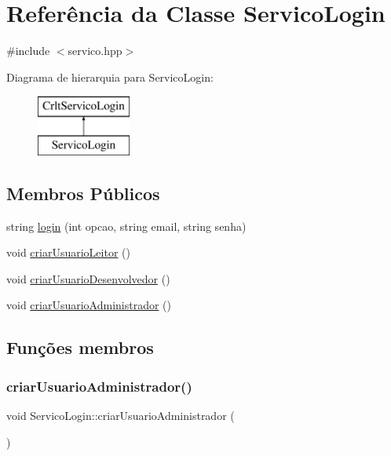 \hypertarget{class_servico_login}{}\section{Referência da Classe Servico\+Login}
\label{class_servico_login}


{\ttfamily \#include $<$servico.\+hpp$>$}

Diagrama de hierarquia para Servico\+Login\+:\begin{figure}[H]
\begin{center}
\leavevmode
\includegraphics[height=2.000000cm]{class_servico_login}
\end{center}
\end{figure}
\subsection*{Membros Públicos}
\begin{DoxyCompactItemize}
\item 
string \mbox{\hyperlink{class_servico_login_a0dd44bd72da82fa932e4929edbefb6ea}{login}} (int opcao, string email, string senha)
\item 
void \mbox{\hyperlink{class_servico_login_ae6786007e98ac8288dc53d025d5f5bcd}{criar\+Usuario\+Leitor}} ()
\item 
void \mbox{\hyperlink{class_servico_login_aff5fc69ce9c3fa82c6c575f025ac2a34}{criar\+Usuario\+Desenvolvedor}} ()
\item 
void \mbox{\hyperlink{class_servico_login_a2f7e5d945f4ce6b06c8ce093ed3755e7}{criar\+Usuario\+Administrador}} ()
\end{DoxyCompactItemize}


\subsection{Funções membros}
\mbox{\label{class_servico_login_a2f7e5d945f4ce6b06c8ce093ed3755e7}} 
\subsubsection{\texorpdfstring{criar\+Usuario\+Administrador()}{criarUsuarioAdministrador()}}
{\footnotesize\ttfamily void Servico\+Login\+::criar\+Usuario\+Administrador (\begin{DoxyParamCaption}{ }\end{DoxyParamCaption})\hspace{0.3cm}{\ttfamily [virtual]}}



